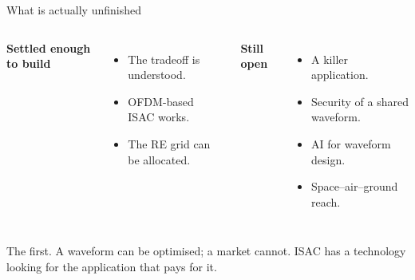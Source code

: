 \begin{frame}{What is actually unfinished}
  \vspace{0.5em}
  \begin{columns}[T,onlytextwidth]
      \large\textbf{\textcolor{softgreen}{Settled enough to build}}

      \vspace{0.5em}
      \small
      \begin{itemize}\itemsep4pt
        \item The tradeoff is understood.
        \item OFDM-based ISAC works.
        \item The RE grid can be allocated.
      \end{itemize}
      \large\textbf{\textcolor{coreorange}{Still open}}

      \vspace{0.5em}
      \small
      \begin{itemize}\itemsep4pt
        \item A killer application.
        \item Security of a shared waveform.
        \item AI for waveform design.
        \item Space--air--ground reach.
      \end{itemize}
  \end{columns}

  \vspace{0.9em}
     {The first. A waveform can be optimised; a market cannot. ISAC has a
      technology looking for the application that pays for it.}

\end{frame}

